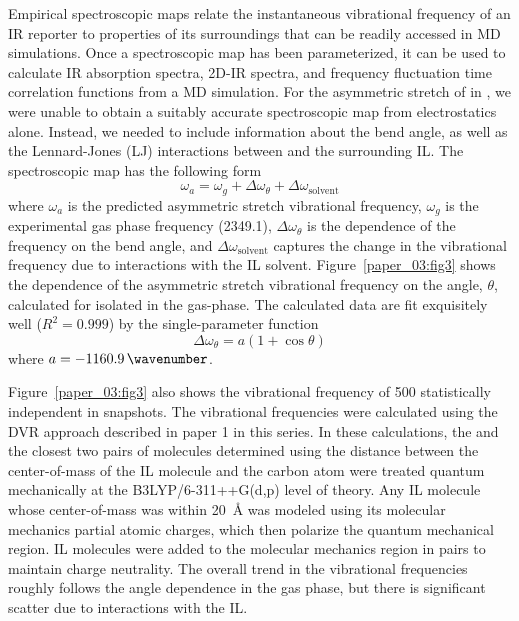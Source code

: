 \documentclass[%
  class = book,%
  crop = false,%
  float = true,%
  multi = true,%
  preview = false,%
]{standalone}
\let\cite\autocite
\begin{document}
Empirical spectroscopic maps relate the instantaneous vibrational frequency of an IR reporter to properties of its surroundings that can be readily accessed in MD simulations.\cite{lin_water_2009-1,Terranova2014,malolepsza_empirical_2014} Once a spectroscopic map has been parameterized, it can be used to calculate IR absorption spectra, 2D-IR spectra, and frequency fluctuation time correlation functions from a MD simulation. For the asymmetric stretch of  in \ce{[C4C1im][PF6]}, we were unable to obtain a suitably accurate spectroscopic map from electrostatics alone. Instead, we needed to include information about the  bend angle, as well as the Lennard-Jones (LJ) interactions between  and the surrounding IL. The spectroscopic map has the following form
\begin{equation}
  \label{paper_03:eq:1}
  \omega_{a} = \omega_{g} + \Delta\omega_{\theta} + \Delta\omega_{\text{solvent}}
\end{equation}
where \(\omega_{a}\) is the predicted  asymmetric stretch vibrational frequency, \(\omega_{g}\) is the experimental gas phase frequency (\SI{2349.1}{\wavenumber}), \(\Delta\omega_{\theta}\) is the dependence of the frequency on the  bend angle, and \(\Delta\omega_{\text{solvent}}\) captures the change in the vibrational frequency due to interactions with the IL solvent. Figure~\ref{paper_03:fig3} shows the dependence of the  asymmetric stretch vibrational frequency on the  angle, \(\theta\), calculated for  isolated in the gas-phase. The calculated data are fit exquisitely well (\(R^{2} = 0.999\)) by the single-parameter function
\begin{equation}
  \label{paper_03:eq:2}
  \Delta\omega_{\theta} = a(1 + \cos{\theta})
\end{equation}
where \(a = \SI{-1160.9}{\wavenumber}\).

Figure~\ref{paper_03:fig3} also shows the vibrational frequency of \num{500} statistically independent  in \ce{[C4C1im][PF6]} snapshots. The vibrational frequencies were calculated using the DVR approach described in paper 1 in this series. In these calculations, the  and the closest two pairs of \ce{[C4C1im][PF6]} molecules \textemdash{} determined using the distance between the center-of-mass of the IL molecule and the  carbon atom \textemdash{} were treated quantum mechanically at the B3LYP/6-311++G(d,p) level of theory. Any IL molecule whose center-of-mass was within \SI{20}{\angstrom} was modeled using its molecular mechanics partial atomic charges, which then polarize the quantum mechanical region. IL molecules were added to the molecular mechanics region in pairs to maintain charge neutrality. The overall trend in the vibrational frequencies roughly follows the angle dependence in the gas phase, but there is significant scatter due to interactions with the IL.
\end{document}
